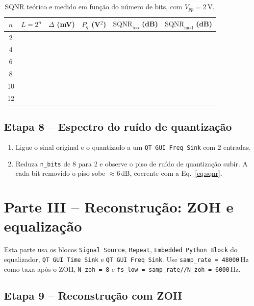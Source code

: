 \documentclass[11pt,a4paper]{article}
\begin{document}
\begin{table}[H]
  \centering
  \begin{tabular}{c c c c c c}
    \toprule
    $n$ & $L = 2^n$ & $\Delta$ (mV) & $P_q$ (V$^2$) &
      $\text{SQNR}_\text{teo}$ (dB) & $\text{SQNR}_\text{med}$ (dB) \\
    \midrule
    2  & & & & & \\
    4  & & & & & \\
    6  & & & & & \\
    8  & & & & & \\
    10 & & & & & \\
    12 & & & & & \\
    \bottomrule
  \end{tabular}
  \caption{SQNR teórico e medido em função do número de bits, com
    $V_{pp}=2$\,V.}
  \label{tab:sqnr}
\end{table}

\subsection*{Etapa 8 -- Espectro do ruído de quantização}

\begin{instrucao}
\begin{enumerate}[label=\arabic*.]
  \item Ligue o sinal original e o quantizado a um \texttt{QT GUI Freq Sink}
    com 2 entradas.
  \item Reduza \texttt{n\_bits} de 8 para 2 e observe o piso de ruído de
    quantização subir. A cada bit removido o piso sobe $\approx 6$\,dB,
    coerente com a Eq.~\eqref{eq:sqnr}.
\end{enumerate}
\end{instrucao}

\section{Parte III -- Reconstrução: ZOH e equalização}

Esta parte usa os blocos \texttt{Signal Source}, \texttt{Repeat},
\texttt{Embedded Python Block} do equalizador, \texttt{QT GUI Time Sink} e
\texttt{QT GUI Freq Sink}. Use
\texttt{samp\_rate = 48000}\,Hz como taxa após o ZOH, \texttt{N\_zoh = 8} e
\texttt{fs\_low = samp\_rate//N\_zoh = 6000}\,Hz.

\subsection*{Etapa 9 -- Reconstrução com ZOH}
\end{document}
